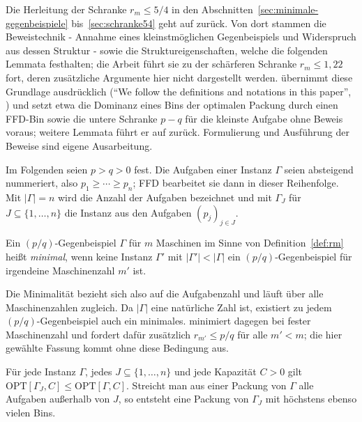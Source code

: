 Die Herleitung der Schranke $r_m \le 5/4$ in den Abschnitten~\ref{sec:minimale-gegenbeispiele}
bis~\ref{sec:schranke54} geht auf \textcite{coffman1978} zurück.
Von dort stammen die Beweistechnik - Annahme eines kleinstmöglichen Gegenbeispiels und
Widerspruch aus dessen Struktur - sowie die Struktureigenschaften, welche die folgenden Lemmata
festhalten; die Arbeit führt sie zu der schärferen Schranke $r_m \le 1{,}22$ fort, deren
zusätzliche Argumente hier nicht dargestellt werden.
\textcite{cao1995} übernimmt diese Grundlage ausdrücklich (\enquote{We follow the definitions and
notations in this paper}, \cite[S.~79]{cao1995}) und setzt etwa die Dominanz eines Bins der
optimalen Packung durch einen FFD-Bin \cite[S.~88]{cao1995} sowie die untere Schranke $p - q$ für
die kleinste Aufgabe \cite[S.~80]{cao1995} ohne Beweis voraus; weitere Lemmata führt er auf
\textcite{yue1990} zurück.
Formulierung und Ausführung der Beweise sind eigene Ausarbeitung.

Im Folgenden seien $p > q > 0$ fest.
Die Aufgaben einer Instanz $\Gamma$ seien absteigend nummeriert, also $p_1 \ge \cdots \ge p_n$;
FFD bearbeitet sie dann in dieser Reihenfolge.
Mit $|\Gamma| = n$ wird die Anzahl der Aufgaben bezeichnet und mit $\Gamma_J$ für
$J \subseteq \{1, \ldots, n\}$ die Instanz aus den Aufgaben $(p_j)_{j \in J}$.

\begin{definition}
\label{def:minimales-gegenbeispiel}
Ein $(p/q)$-Gegenbeispiel $\Gamma$ für $m$ Maschinen im Sinne von Definition~\ref{def:rm} heißt
\emph{minimal}, wenn keine Instanz $\Gamma'$ mit $|\Gamma'| < |\Gamma|$ ein $(p/q)$-Gegenbeispiel
für irgendeine Maschinenzahl $m'$ ist.
\end{definition}

Die Minimalität bezieht sich also auf die Aufgabenzahl und läuft über alle Maschinenzahlen
zugleich.
Da $|\Gamma|$ eine natürliche Zahl ist, existiert zu jedem $(p/q)$-Gegenbeispiel auch ein
minimales.
\textcite{cao1995} minimiert dagegen bei fester Maschinenzahl und fordert dafür zusätzlich
$r_{m'} \le p/q$ für alle $m' < m$; die hier gewählte Fassung kommt ohne diese Bedingung aus.

\begin{bemerkung}[Teilinstanzen]
\label{bem:teilinstanz}
Für jede Instanz $\Gamma$, jedes $J \subseteq \{1, \ldots, n\}$ und jede Kapazität $C > 0$ gilt
$\mathrm{OPT}[\Gamma_J, C] \le \mathrm{OPT}[\Gamma, C]$.
Streicht man aus einer Packung von $\Gamma$ alle Aufgaben außerhalb von $J$, so entsteht eine
Packung von $\Gamma_J$ mit höchstens ebenso vielen Bins.
\end{bemerkung}

